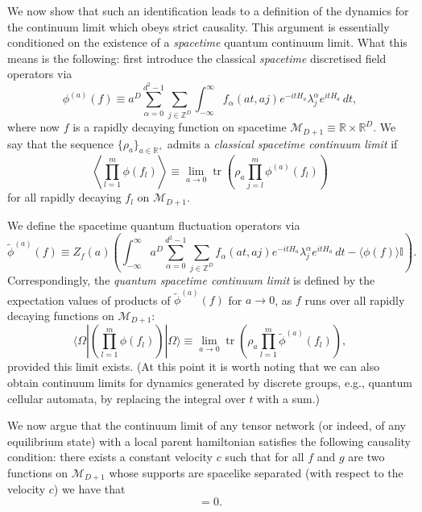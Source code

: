 \documentclass[prl,twocolumn,lengthcheck,superscriptaddress]{revtex4-1}
\newcommand{\tr}{\operatorname{tr}}
\theoremstyle{definition}
\theoremstyle{remark}
\begin{document}
We now show that such an identification leads to a definition of the dynamics for the continuum limit which obeys strict causality. This argument is essentially conditioned on the existence of a \emph{spacetime} quantum continuum limit. What this means is the following: first introduce the classical \emph{spacetime} discretised field operators via
\begin{equation}
	\phi^{(a)}(f) \equiv a^D\sum_{\alpha = 0}^{d^2-1}\sum_{j\in\mathbb{Z}^D} \int_{-\infty}^\infty f_\alpha(at, aj) e^{-itH_a}\lambda^\alpha_je^{itH_a} \, dt,
\end{equation}
where now $f$ is a rapidly decaying function on spacetime $\mathcal{M}_{D+1}\equiv\mathbb{R}\times \mathbb{R}^D$. We say that the sequence 
$\{\rho_a\}_{a\in\mathbb{R}^+}$ admits a \emph{classical spacetime continuum limit} if 
\begin{equation}
	\left\langle\prod_{l=1}^m\phi(f_l)\right\rangle \equiv \lim_{a\rightarrow 0} \tr\left(\rho_a \prod_{j=l}^m\phi^{(a)}(f_l)\right)
\end{equation}
for all rapidly decaying $f_l$ on $\mathcal{M}_{D+1}$.

We define the spacetime quantum fluctuation operators via
\begin{equation}
	\widetilde{\phi}^{(a)}(f) \equiv Z_f(a)\left( \int_{-\infty}^\infty  a^D\sum_{\alpha = 0}^{d^2-1}\sum_{j\in \mathbb{Z}^D} f_\alpha(at, aj) e^{-itH_a}\lambda^\alpha_je^{itH_a} \,dt - \langle\phi(f)\rangle\mathbb{I}\right).
\end{equation}
Correspondingly, the \emph{quantum spacetime continuum limit} is defined by the expectation values of products of $\widetilde{\phi}^{(a)}(f)$ for $a\rightarrow 0$, as $f$ runs over all rapidly decaying functions on $\mathcal{M}_{D+1}$:
\begin{equation}\label{eq:qsctslimit}
	\langle\Omega|\left(\prod_{l=1}^m\widehat{\phi}(f_l)\right)|\Omega\rangle \equiv \lim_{a\rightarrow 0} \tr\left(\rho_a \prod_{l=1}^m\widetilde{\phi}^{(a)}(f_l)\right),
\end{equation}
provided this limit exists.
(At this point it is worth noting that we can also obtain continuum limits for dynamics generated by discrete groups, e.g., quantum cellular automata, by replacing the integral over $t$ with a sum.)

We now argue that the continuum limit of any tensor network (or indeed, of any equilibrium state) with a local parent hamiltonian satisfies the following causality condition: there exists a constant velocity $c$ such that for all $f$ and $g$ are two functions on $\mathcal{M}_{D+1}$ whose supports are spacelike separated (with respect to the velocity $c$) we have that
\begin{equation}
	[\widehat{\phi}(f), \widehat{\phi}(g)]  = 0.
\end{equation}
\end{document}
